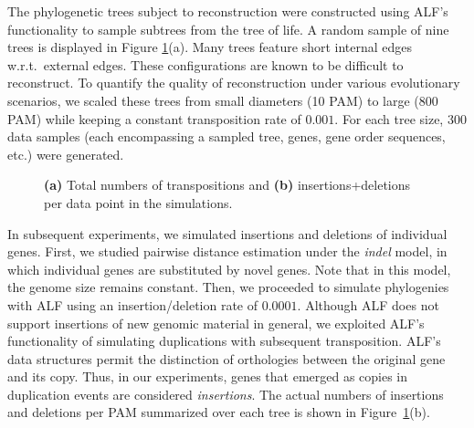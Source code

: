 \documentclass[9pt,english,utf8]{article}
\begin{document}
\medskip
The phylogenetic trees subject to reconstruction were constructed using ALF's
functionality to sample subtrees from the tree of life. A random sample of nine
trees is displayed in Figure \ref{fig:mutations}(a). Many trees feature short
internal edges w.r.t.~external edges.  These configurations are known to be
difficult to reconstruct. To quantify the quality of reconstruction under
various evolutionary scenarios, we scaled these trees from small diameters (10
PAM) to large (800 PAM) while keeping a constant transposition rate of
$0.001$. For each tree size, 300 data samples (each encompassing a sampled
tree, genes, gene order sequences, etc.) were generated. 

\begin{figure}[tbh]
    \caption{\textbf{(a)} Total numbers of transpositions and \textbf{(b)}
    insertions+deletions per data point in the simulations.}
    \label{fig:mutations}
\end{figure}

In subsequent experiments, we simulated insertions and deletions of individual
genes. First, we studied pairwise distance estimation under the \emph{indel}
model, in which individual genes are substituted by novel genes.  Note that in
this model, the genome size remains constant.  Then, we proceeded to simulate
phylogenies with ALF using an insertion/deletion rate of $0.0001$.  Although
ALF does not support insertions of new genomic material in general, we
exploited ALF's functionality of simulating duplications with subsequent
transposition.  ALF's data structures permit the distinction of orthologies
between the original gene and its copy. Thus, in our experiments, genes that
emerged as copies in duplication events are considered \emph{insertions}. The
actual numbers of insertions and deletions per PAM summarized over each tree is
shown in Figure~\ref{fig:mutations}(b).
\end{document}
